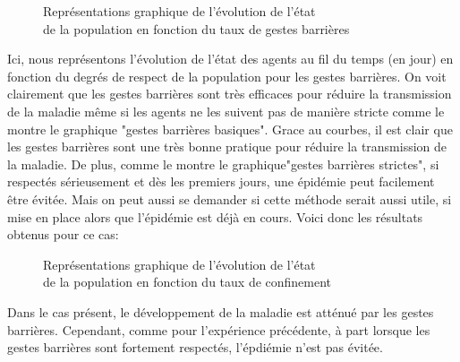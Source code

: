 \documentclass[a4paper, 12pt]{report}
\begin{document}
\begin{figure}[h]
	\centering
	\qquad
	\centering
	\qquad
	\caption{Représentations graphique de l'évolution de l'état\\ de la population en fonction du taux de gestes barrières}

\end{figure}

\newpage

Ici, nous représentons l'évolution de l'état des agents au fil du temps (en jour) en fonction du degrés de respect de la population pour les gestes barrières.
On voit clairement que les gestes barrières sont très efficaces pour réduire la transmission de la maladie même si les agents ne les suivent pas de manière stricte comme le montre le graphique
"gestes barrières basiques".
Grace au courbes, il est clair que les gestes barrières sont une très bonne
pratique pour réduire la transmission de la maladie. De plus, comme le montre le graphique"gestes barrières strictes", si respectés sérieusement et dès les premiers jours, une épidémie peut facilement
être évitée. Mais on peut aussi se demander si cette méthode serait aussi utile, si mise en place alors que l'épidémie est déjà en cours. Voici donc les résultats obtenus pour ce cas:

\begin{figure}[h]
	\centering
	\qquad
	\centering
	\qquad
	\caption{Représentations graphique de l'évolution de l'état\\ de la population en fonction du taux de confinement}

\end{figure}

\newpage

Dans le cas présent, le développement de la maladie est atténué par les gestes barrières. Cependant, comme pour l'expérience précédente, à part lorsque les gestes barrières sont fortement respectés,
l'épdiémie n'est pas évitée.
\end{document}
